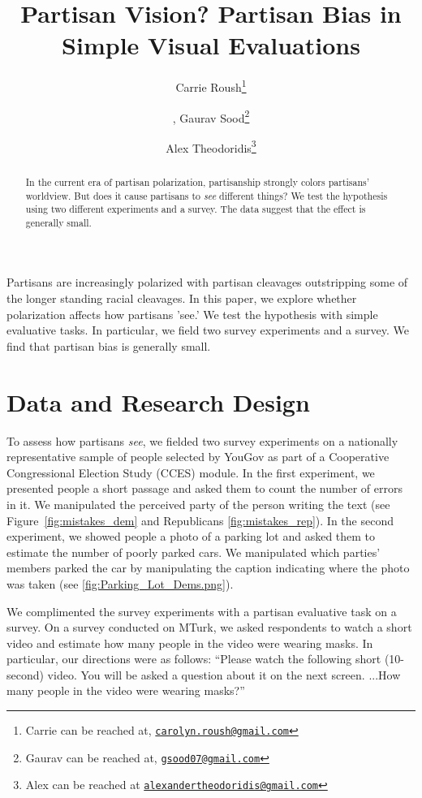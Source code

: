 \documentclass[12pt, letterpaper]{article}
\title{Partisan Vision? Partisan Bias in Simple Visual Evaluations}
\author{Carrie Roush\thanks{Carrie can be reached at, \href{mailto:carolyn.roush@gmail.com}{\texttt{carolyn.roush@gmail.com}}} \and, Gaurav Sood\thanks{Gaurav can be reached at, \href{mailto:gsood07@gmail.com}{\texttt{gsood07@gmail.com}}} \and Alex Theodoridis\thanks{Alex can be reached at \href{alexandertheodoridis@gmail.com}{\texttt{alexandertheodoridis@gmail.com}}}}
\begin{document}
\maketitle
\thispagestyle{empty}

\begin{abstract}

\noindent In the current era of partisan polarization, partisanship strongly colors partisans' worldview. But does it cause partisans to \textit{see} different things? We test the hypothesis using two different experiments and a survey. The data suggest that the effect is generally small.
\end{abstract}

\newpage

\doublespacing

Partisans are increasingly polarized \cite{IyengarSoodLelkes2012} with partisan cleavages outstripping some of the longer standing racial cleavages. In this paper, we explore whether polarization affects how partisans 'see.' We test the hypothesis with simple evaluative tasks. In particular, we field two survey experiments and a survey. We find that partisan bias is generally small.

\section{Data and Research Design}
To assess how partisans \textit{see}, we fielded two survey experiments on a nationally representative sample of people selected by YouGov \citep{rivers2007} as part of a Cooperative Congressional Election Study (CCES) module. In the first experiment, we presented people a short passage and asked them to count the number of errors in it. We manipulated the perceived party of the person writing the text (see Figure~\ref{fig:mistakes_dem} and Republicans \ref{fig:mistakes_rep}). In the second experiment, we showed people a photo of a parking lot and asked them to estimate the number of poorly parked cars. We manipulated which parties' members parked the car by manipulating the caption indicating where the photo was taken (see \ref{fig:Parking_Lot_Dems.png}).

We complimented the survey experiments with a partisan evaluative task on a survey. On a survey conducted on MTurk, we asked respondents to watch a short video and estimate how many people in the video were wearing masks. In particular, our directions were as follows: ``Please watch the following short (10-second) video. You will be asked a question about it on the next screen. ...How many people in the video were wearing masks?''
\end{document}
